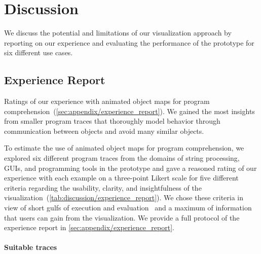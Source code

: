 \section{Discussion}
\label{sec:discussion}

We discuss the potential and limitations of our visualization approach by reporting on our experience and evaluating the performance of the \tfd{} prototype for six different use cases.

\subsection{Experience Report}
\label{sec:discussion/experience_report}

\begin{table}
	\centering
	\caption{
		Ratings of our experience with animated object maps for program comprehension~(\cref{sec:appendix/experience_report}).
		We gained the most insights from smaller program traces that thoroughly model behavior through communication between objects and avoid many similar objects.
	}
	\label{tab:discussion/experience_report}
	\begin{threeparttable}
		\centering
		{\footnotesize
		}
	\end{threeparttable}
\end{table}

To estimate the use of animated object maps for program comprehension, we explored six different program traces from the domains of string processing, GUIs, and programming tools in the \tfd{} prototype and gave a reasoned rating of our experience with each example on a three-point Likert scale for five different criteria regarding the usability, clarity, and insightfulness of the visualization~(\cref{tab:discussion/experience_report}).
We chose these criteria in view of short gulfs of execution and evaluation~\cite{norman1986cognitive} and a maximum of information that users can gain from the visualization.
We provide a full protocol of the experience report in \cref{sec:appendix/experience_report}.

\paragraph{Suitable traces}

